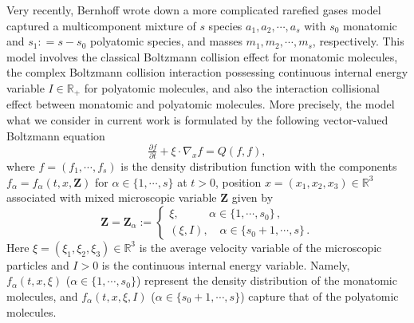 \documentclass[reqno,11pt]{amsart}
\numberwithin{equation}{section}
\def\R{\mathbb{R}}
\begin{document}
Very recently, Bernhoff \cite{N.Bernhoff-2023} wrote down a more complicated rarefied gases model captured a multicomponent mixture of $s$ species $a_1, a_2, \cdots, a_s$ with $s_0$ monatomic and $s_1 : = s - s_0$ polyatomic species, and masses $m_1, m_2, \cdots, m_s$, respectively. This model involves the classical Boltzmann collision effect for monatomic molecules, the complex Boltzmann collision interaction possessing continuous internal energy variable $I \in \R_+$ for polyatomic molecules, and also the interaction collisional effect between monatomic and polyatomic molecules. More precisely, the model what we consider in current work is formulated by the following vector-valued Boltzmann equation  
\begin{equation}\label{BE-MP}
	\tfrac{\partial f}{\partial t } + \xi \cdot \nabla_x f = Q(f,f),
\end{equation}
where $ f = ( f_1, \cdots , f_s ) $ is the density distribution function with the components $ f_\alpha = f_\alpha ( t, x, \mathbf{Z} ) $ for $\alpha \in \{1,\cdots , s\}$ at $t > 0$, position $x = ( x_1, x_2, x_3 ) \in \R^3$ associated with mixed microscopic variable $ \mathbf{Z} $ given by 
\begin{equation}\label{eq2.01}
	\mathbf{Z} =\mathbf{Z}_\alpha :=
	\begin{cases}
		 \xi, \qquad \enspace \, \alpha \in \{1,\cdots , s_0 \} \,, \\
		( \xi , I )  , \quad \alpha \in \{s_0 +1,\cdots , s \} \,.
	\end{cases}
\end{equation} 
Here $\xi  = (\xi_1, \xi_2 ,\xi_3 ) \in \R^3$ is the average velocity variable of the microscopic particles and $I > 0$ is the continuous internal energy variable. Namely, $f_\alpha (t, x, \xi)$ ($\alpha \in \{ 1, \cdots, s_0 \}$) represent the density distribution of the monatomic molecules, and $f_\alpha (t, x, \xi, I)$ ($\alpha \in \{ s_0 + 1, \cdots, s \}$) capture that of the polyatomic molecules.
\end{document}

